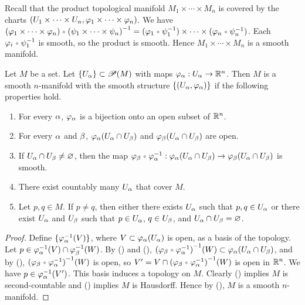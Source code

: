 \documentclass[10pt]{article}
\begin{document}
\begin{example}
    Recall that the product topological manifold ${M}_{1}\times\cdots\times{M}_{n}$ is covered by the charts $({U}_{1}\times\cdots\times{U}_{n},{\varphi}_{1}\times\cdots\times{\varphi}_{n})$. We have $({\vp}_{1}\times\cdots\times{\vp}_{n})\comp{({\psi}_{1}\times\cdots\times{\psi}_{n})}^{-1}=({\vp}_{1}\comp{\psi}_{1}^{-1})\times\cdots\times({\vp}_{n}\comp{\psi}_{n}^{-1})$. Each ${\vp}_{i}\comp{\psi}_{1}^{-1}$ is smooth, so the product is smooth. Hence ${M}_{1}\times\cdots\times{M}_{n}$ is a smooth manifold.
\end{example}
\begin{theorem}
    Let $M$ be a set. Let $\{{U}_{\alpha}\}\subset\mathscr{P}(M)$ with maps ${\varphi}_{\alpha}:{U}_{\alpha}\to{\mathbb{R}}^{n}$. Then $M$ is a smooth $n$-manifold with the smooth structure $\{({U}_{\alpha},{\varphi}_{\alpha})\}$ if the following properties hold.
    \begin{enumerate}
        \item For every $\alpha$, ${\varphi}_{\alpha}$ is a bijection onto an open subset of ${\mathbb{R}}^{n}$.
        \item For every $\alpha$ and $\beta$, ${\varphi}_{\alpha}({U}_{\alpha}\cap{U}_{\beta})$ and ${\varphi}_{\beta}({U}_{\alpha}\cap{U}_{\beta})$ are open.
        \item If ${U}_{\alpha}\cap{U}_{\beta}\ne\varnothing$, then the map ${\vp}_{\be}\comp{\vp}_{\al}^{-1}:{\vp}_{\al}({U}_{\al}\cap{U}_{\be})\to{\vp}_{\be}({U}_{\al}\cap{U}_{\be})$ is smooth.
        \item There exist countably many ${U}_{\alpha}$ that cover $M$.
        \item Let $p,q\in M$. If $p\ne q$, then either there exists ${U}_{\alpha}$ such that $p,q\in{U}_{\alpha}$ or there exist ${U}_{\alpha}$ and ${U}_{\beta}$ such that $p\in{U}_{\alpha}$, $q\in{U}_{\beta}$, and ${U}_{\alpha}\cap{U}_{\beta}=\varnothing$.
    \end{enumerate}
\end{theorem}
\begin{proof}
    Define $\{{\varphi}_{\alpha}^{-1}(V)\}$, where $V\subset{\varphi}_{\alpha}({U}_{\alpha})$ is open, as a basis of the topology. Let $p\in{\varphi}_{\alpha}^{-1}(V)\cap{\varphi}_{\beta}^{-1}(W)$. By () and (), ${({\vp}_{\be}\comp{\vp}_{\al}^{-1})}^{-1}(W)\sub{\vp}_{\al}({U}_{\al}\cap{U}_{\be})$, and by (), ${({\vp}_{\be}\comp{\vp}_{\al}^{-1})}^{-1}(W)$ is open, so $V'=V\cap{({\vp}_{\be}\comp{\vp}_{\al}^{-1})}^{-1}(W)$ is open in ${\mathbb{R}}^{n}$. We have $p\in{\varphi}_{\alpha}^{-1}(V')$. This basis induces a topology on $M$. Clearly () implies $M$ is second-countable and () implies $M$ is Hausdorff. Hence by (), $M$ is a smooth $n$-manifold.
\end{proof}
\end{document}
